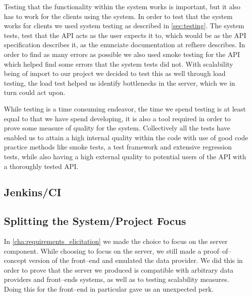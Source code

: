 \bigskip
Testing that the functionality within the system works is important, but it also has to work for the clients using the system.
In order to test that the system works for clients we used system testing as described in \cref{sec:testing}.
The system tests, test that the API acts as the user expects it to, which would be as the API specification describes it, as the enunciate documentation at refhere describes.
In order to find as many errors as possible we also used smoke testing for the API which helped find some errors that the system tests did not.
With scalability being of import to our project we decided to test this as well through load testing, the load test helped us identify bottlenecks in the server, which we in turn could act upon.

While testing is a time consuming endeavor, the time we spend testing is at least equal to that we have spend developing, it is also a tool required in order to prove some measure of quality for the system.
Collectively all the tests have enabled us to attain a high internal quality within the code with use of good code practice methods like smoke tests, a test framework and extensive regression tests, while also having a high external quality to potential users of the API with a thoroughly tested API.



\subsection{Jenkins/CI}
\subsection{Splitting the System/Project Focus}
In \cref{cha:requirements_elicitation} we made the choice to focus on the server component.
While choosing to focus on the server, we still made a proof--of--concept version of the front--end and emulated the data provider.
We did this in order to prove that the server we produced is compatible with arbitrary data providers and front--ends systems, as well as to testing scalability measures.
Doing this for the front--end in particular gave us an unexpected perk.

